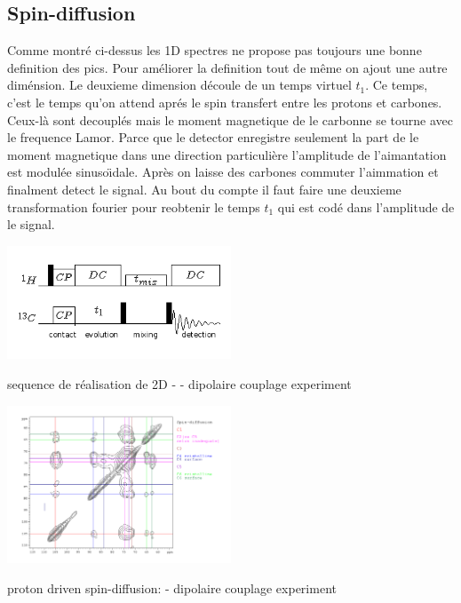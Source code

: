 \documentclass[a4paper,12pt]{scrartcl}
\begin{document}
  \subsection{Spin-diffusion}
Comme montré ci-dessus les 1D spectres ne propose pas toujours une bonne definition des pics. Pour  améliorer la definition tout de même on ajout une autre diménsion. Le deuxieme dimension découle de un temps virtuel $t_1$. Ce temps, c'est le temps qu'on attend aprés le spin transfert entre les protons et carbones. Ceux-là sont decouplés mais le moment magnetique de le carbonne se tourne avec le frequence Lamor. Parce que le detector 	 enregistre seulement la part de le moment magnetique dans une direction particulière l'amplitude de l'aimantation est modulée sinuso\"{\i}dale. Après on laisse des carbones commuter l'aimmation et finalment detect le signal. 	 Au bout du compte il faut faire une deuxieme transformation fourier pour reobtenir le temps $t_1$ qui est codé dans l'amplitude de le signal.
\begin{figurehere}
    \center
     \includegraphics[width=0.5\textwidth]{bilder/PDSD2.png}
     \caption{sequence de réalisation de 2D -  -  dipolaire couplage experiment}
    \end{figurehere}
\begin{figurehere}
    \center
    \includegraphics[width=0.5\textwidth]{bilder/spin_diff.png}
    \caption{proton driven spin-diffusion:  -  dipolaire couplage experiment}
   \end{figurehere}
\end{document}
